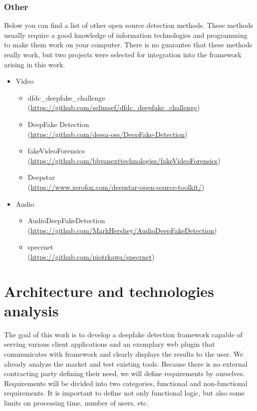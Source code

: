 \subsection{Other}

Below you can find a list of other open source detection methods. These methods usually require a good knowledge of information technologies and programming to make them work on your computer. There is no guarantee that these methods really work, but two projects were selected for integration into the framework arising in this work.

\begin{itemize}
    \item Video
    \begin{itemize}
        \item dfdc\_deepfake\_challenge \\ (\url{https://github.com/selimsef/dfdc_deepfake_challenge})
        \item DeepFake Detection \\ (\url{https://github.com/dessa-oss/DeepFake-Detection})
        \item fakeVideoForensics \\ (\url{https://github.com/bbvanexttechnologies/fakeVideoForensics})
        \item Deepstar \\ (\url{https://www.zerofox.com/deepstar-open-source-toolkit/})
    \end{itemize}
\end{itemize}
\clearpage
\begin{itemize}
    \item Audio
    \begin{itemize}
        \item AudioDeepFakeDetection \\ (\url{https://github.com/MarkHershey/AudioDeepFakeDetection})
        \item specrnet \\ (\url{https://github.com/piotrkawa/specrnet})
    \end{itemize}
\end{itemize}

\chapter{Architecture and technologies analysis}

The goal of this work is to develop a deepfake detection framework capable of serving various client applications and an exemplary web plugin that communicates with framework and clearly displays the results to the user. We already analyze the market and test existing tools. Because there is no external contracting party defining their need, we will define requirements by ourselves. Requirements will be divided into two categories, functional and non-functional requirements. It is important to define not only functional logic, but also some limits on processing time, number of users, etc.

